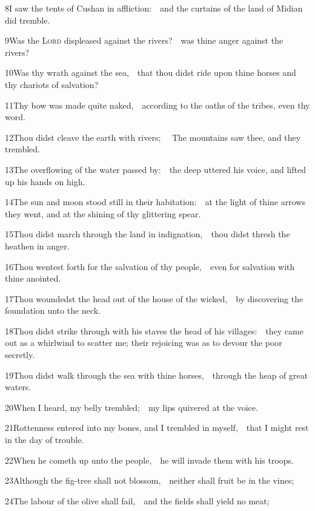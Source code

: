 8\enspace I saw the tents of Cushan in affliction:\ \star\ and the curtains of the land of Midian did tremble.

9\enspace Was the {\scshape Lord} displeased against the rivers?\ \star\ was thine anger against the rivers?

10\enspace Was thy wrath against the sea,\ \star\ that thou didst ride upon thine horses and thy chariots of salvation?

11\enspace Thy bow was made quite naked,\ \star\ according to the oaths of the tribes, even thy word.

12\enspace Thou didst cleave the earth with rivers; \ \star\ The mountains saw thee, and they trembled.

13\enspace The overflowing of the water passed by:\ \star\ the deep uttered his voice, and lifted up his hands on high.

14\enspace The sun and moon stood still in their habitation:\ \star\ at the light of thine arrows they went, and at the shining of thy glittering spear.

15\enspace Thou didst march through the land in indignation,\ \star\ thou didst thresh the heathen in anger.

16\enspace Thou wentest forth for the salvation of thy people,\ \star\ even for salvation with thine anointed.

17\enspace Thou woundedst the head out of the house of the wicked,\ \star\ by discovering the foundation unto the neck.

18\enspace Thou didst strike through with his staves the head of his villages:\ \star\ they came out as a whirlwind to scatter me; their rejoicing was as to devour the poor secretly.

19\enspace  Thou didst walk through the sea with thine horses,\ \star\ through the heap of great waters.

20\enspace When I heard, my belly trembled;\ \star\ my lips quivered at the voice.

21\enspace Rottenness entered into my bones, and I trembled in myself,\ \star\ that I might rest in the day of trouble.

22\enspace When he cometh up unto the people,\ \star\ he will invade them with his troops.

23\enspace Although the fig-tree shall not blossom,\ \star\ neither shall fruit be in the vines;

24\enspace The labour of the olive shall fail,\ \star\ and the fields shall yield no meat;

